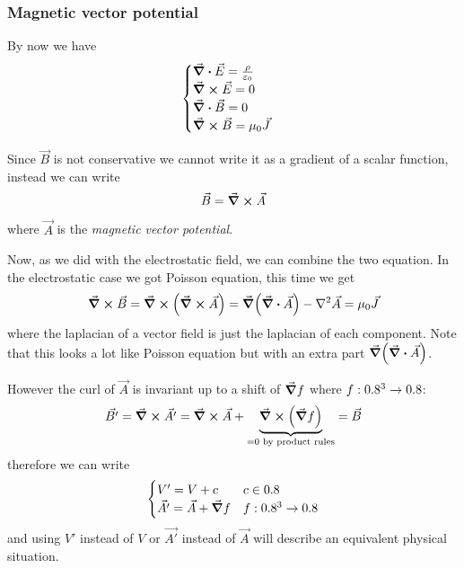 \documentclass[12pt]{extarticle}
\begin{document}
\subsubsection{Magnetic vector potential}

By now we have
\begin{equation}
    \begin{cases}
        \div \vec E = \frac{\rho}{\varepsilon_0} \\
        \curl \vec E = 0                         \\
        \div \vec B = 0                          \\
        \curl \vec B = \mu_0 \vec J
    \end{cases}
\end{equation}

Since $\vec B$ is not conservative we cannot write it as a gradient of a scalar function,
instead we can write
\begin{equation}
    \vec B = \curl \vec A
\end{equation}
where $\vec A$ is the \emph{magnetic vector potential}.

Now, as we did with the electrostatic field, we can combine the two equation.
In the electrostatic case we got Poisson equation, this time we get
\begin{equation}
    \curl \vec B = \curl (\curl \vec A) = \grad(\div \vec A) - \laplacian{\vec A} = \mu_0 \vec J
\end{equation}
where the laplacian of a vector field is just the laplacian of each component.
Note that this looks a lot like Poisson equation but with an extra part $\grad(\div \vec A)$.

However the curl of $\vec A$ is invariant up to a shift of $\grad f$ where $f: 0.8^3 \to 0.8$:
\begin{equation}
    \vec {B'} = \curl \vec{A '} = \curl \vec A + \underbrace{\curl (\grad f)}_{= 0 \text{ by product rules}} = \vec B
\end{equation}
therefore we can write
\begin{equation}
    \begin{cases}
        V' = V + c                  & c \in 0.8        \\
        \vec{A'} = \vec A + \grad f & f : 0.8^3 \to 0.8
    \end{cases}
\end{equation}
and using $V'$ instead of $V$ or $\vec{A'}$ instead of $\vec A$ will describe an equivalent physical situation.
\end{document}

